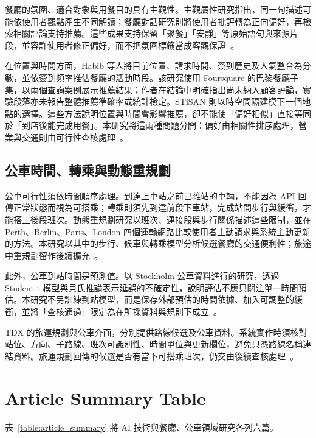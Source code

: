 餐廳的氛圍、適合對象與用餐目的具有主觀性。主觀屬性研究指出，同一句描述可能依使用者觀點產生不同解讀；餐廳對話研究則將使用者批評轉為正向偏好，再檢索相關評論支持推薦。這些成果支持保留「聚餐」「安靜」等原始語句與來源片段，並容許使用者修正偏好，而不把氛圍標籤當成客觀保證~\cite{subjective_attributes,critique_preference}。

在位置與時間方面，Habib 等人將目前位置、請求時間、簽到歷史及人氣整合為分數，並依簽到頻率推估餐廳的活動時段。該研究使用 Foursquare 的巴黎餐廳子集，以兩個查詢案例展示推薦結果；作者在結論中明確指出尚未納入顧客評論，實驗段落亦未報告整體推薦準確率或統計檢定。STiSAN 則以時空間隔建模下一個地點的選擇。這些方法說明位置與時間會影響推薦，卻不能使「偏好相似」直接等同於「到店後能完成用餐」。本研究將這兩種問題分開：偏好由相關性排序處理，營業與交通則由可行性查核處理~\cite{restaurant_habib,poi_stisan}。

\subsection{公車時間、轉乘與動態重規劃}

公車可行性須依時間順序處理。到達上車站之前已離站的車輛，不能因為 API 回傳正常狀態而視為可搭乘；轉乘則須先到達前段下車站，完成站間步行與緩衝，才能搭上後段班次。動態重規劃研究以班次、連接段與步行關係描述這些限制，並在 Perth、Berlin、Paris、London 四個運輸網路比較使用者主動請求與系統主動更新的方法。本研究以其中的步行、候車與轉乘模型分析候選餐廳的交通便利性；旅途中重規劃留作後續擴充~\cite{bus_dynamic_replanning}。

此外，公車到站時間是預測值。以 Stockholm 公車資料進行的研究，透過 Student-t 模型與貝氏推論表示延誤的不確定性，說明評估不應只關注單一時間預估。本研究不另訓練到站模型，而是保存外部預估的時間依據、加入可調整的緩衝，並將「查核通過」限定為在所採資料與規則下成立~\cite{bus_delay_uncertainty}。

TDX 的旅運規劃與公車介面，分別提供路線候選及公車資料。系統實作時須核對站位、方向、子路線、班次可識別性、時間單位與更新欄位，避免只憑路線名稱連結資料。旅運規劃回傳的候選是否有當下可搭乘班次，仍交由後續查核處理~\cite{tdx_planner,tdx_bus}。

\section{Article Summary Table}

表~\ref{table:article_summary} 將 AI 技術與餐廳、公車領域研究各列六篇。




